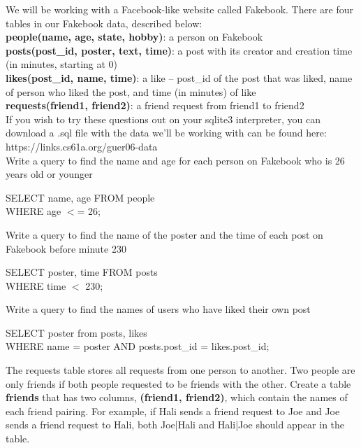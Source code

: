 \question
We will be working with a Facebook-like website called Fakebook. There are four tables in our Fakebook data, described below:\\

\textbf{people(name, age, state, hobby)}: a person on Fakebook \\

\textbf{posts(post\_id, poster, text, time)}: a post with its creator and creation time (in minutes, starting at 0)\\

\textbf{likes(post\_id, name, time)}: a like -- post\_id of the post that was liked, name of person who liked the post, and time (in minutes) of like\\

\textbf{requests(friend1, friend2)}: a friend request from friend1 to friend2\\

If you wish to try these questions out on your sqlite3 interpreter, you can download a .sql file with the data we'll be working with can be found here:\\ https://links.cs61a.org/guer06-data\\

Write a query to find the name and age for each person on Fakebook who is 26 years old or younger

\begin{solution}[0.5in]
SELECT name, age FROM people \\
WHERE age $<$= 26;
\end{solution}

\question
Write a query to find the name of the poster and the time of each post on Fakebook before minute 230

\begin{solution}[0.5in]
SELECT poster, time FROM posts \\
WHERE time $<$ 230;
\end{solution}

\question
Write a query to find the names of users who have liked their own post

\begin{solution}[0.5in]
SELECT poster from posts, likes\\
WHERE name = poster AND posts.post\_id = likes.post\_id;
\end{solution}

\question
The requests table stores all requests from one person to another.  Two people are only friends if both people requested to be friends with the other. Create a table \textbf{friends} that has two columns, \textbf{(friend1, friend2)}, which contain the names of each friend pairing. For example, if Hali sends a friend request to Joe and Joe sends a friend request to Hali, both Joe|Hali and Hali|Joe should appear in the table.

